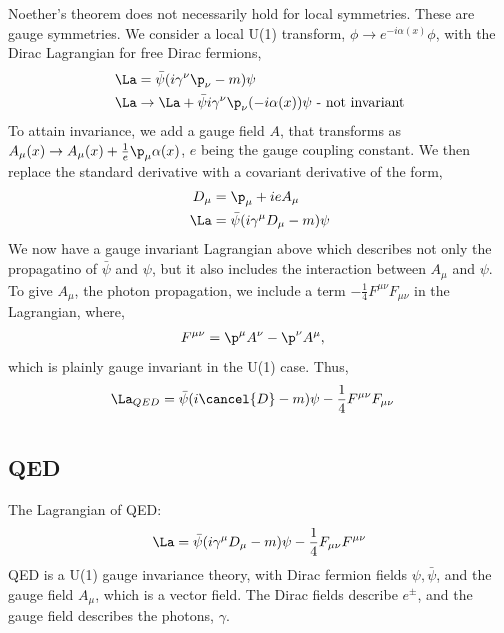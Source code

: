 \documentclass[relqm.tex]{subfiles}
\begin{document}
Noether's theorem does not necessarily hold for local symmetries. 
These are gauge symmetries. 
We consider a local U(1) transform, $\phi\to e^{-i\alpha(x)}\phi$, with the Dirac Lagrangian for free Dirac fermions, 
\begin{align}
    \La &= \bar{\psi}(i\gamma^\nu\p_\nu - m)\psi \\
    \La &\to \La + \bar{\psi}i\gamma^\nu\p_\nu(-i\alpha(x))\psi \text{ - not invariant}
\end{align}
To attain invariance, we add a gauge field $A$, that transforms as $A_\mu(x)\to A_\mu(x)+\frac{1}{e}\p_\mu\alpha(x)$, $e$ being the gauge coupling constant. 
We then replace the standard derivative with a covariant derivative of the form, 
\begin{align}
    D_\mu &= \p_\mu + ieA_\mu \\
    \La &= \bar{\psi}(i\gamma^\mu D_\mu - m)\psi
\end{align}
We now have a gauge invariant Lagrangian above which describes not only the propagatino of $\bar{\psi}$ and $\psi$, but it also includes the interaction between $A_\mu$ and $\psi$.
To give $A_\mu$, the photon propagation, we include a term $-\frac14 F^{\mu\nu}F_{\mu\nu}$ in the Lagrangian, where,
\begin{align}
    F^{\mu\nu} &= \p^\mu A^\nu - \p^\nu A^\mu,
\end{align}
which is plainly gauge invariant in the U(1) case. 
Thus, 
\begin{align}
    \La_{QED} &= \bar{\psi}(i\cancel{D} - m)\psi - \frac14 F^{\mu\nu}F_{\mu\nu}
\end{align}


\chapter{}
\section{QED}
The Lagrangian of QED:
\begin{align}
    \La = \bar{\psi}(i\gamma^\mu D_\mu - m)\psi - \frac14 F_{\mu\nu}F^{\mu\nu}
\end{align}
QED is a U(1) gauge invariance theory, with Dirac fermion fields $\psi,\bar{\psi}$, and the gauge field $A_\mu$, which is a vector field.
The Dirac fields describe $e^{\pm}$, and the gauge field describes the photons, $\gamma$.
\end{document}
